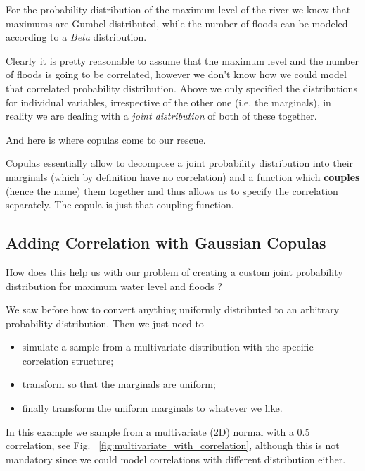 For the probability distribution of the maximum level of the river we
know that maximums are Gumbel distributed, while the number of floods
can be modeled according to a
\href{https://en.wikipedia.org/wiki/Beta_distribution}{\emph{Beta}
distribution}.

Clearly it is pretty reasonable to assume that the maximum level and the
number of floods is going to be correlated, however we don't know how
we could model that correlated probability distribution.
Above we only
specified the distributions for individual variables, irrespective of
the other one (i.e. the marginals), in reality we are dealing with a
\emph{joint distribution} of both of these together.

And here is where copulas come to our rescue.

Copulas essentially allow to decompose a joint probability distribution
into their marginals (which by definition have no correlation) and a
function which \textbf{couples} (hence the name) them together and thus allows us
to specify the correlation separately. The copula is just that coupling
function.

\subsection{Adding Correlation with Gaussian Copulas}\label{adding-correlation-with-gaussian-copulas}

How does this help us with our problem of creating a custom joint
probability distribution for maximum water level and floods ?

We saw before how to convert
anything uniformly distributed to an arbitrary probability distribution.
Then we just need to
\begin{itemize}
\tightlist
\item
  simulate a sample from a multivariate distribution with the specific correlation structure;
\item
  transform so that the marginals are uniform;
\item
  finally transform the uniform marginals to whatever we like.
\end{itemize}

In this example we sample from a multivariate (2D) normal with a 0.5 correlation, 
see Fig.~ \ref{fig:multivariate_with_correlation}, although this is not mandatory since
we could model correlations with different distribution either.

